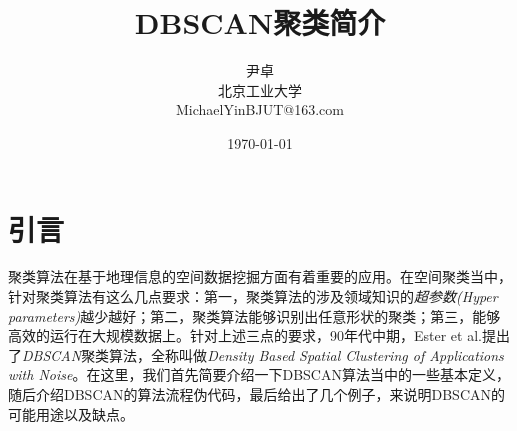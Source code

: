 \documentclass[UTF8, 12pt]{ctexart}
\begin{document}
\title{\heiti DBSCAN聚类简介}
\author{\kaishu 尹卓\\北京工业大学\\MichaelYinBJUT@163.com}
\date{\today}
\maketitle

\tableofcontents
\newpage

\section{引言}
聚类算法在基于地理信息的空间数据挖掘方面有着重要的应用。在空间聚类当中，针对聚类算法有这么几点要求：第一，聚类算法的涉及领域知识的\emph{超参数(Hyper parameters)}越少越好；第二，聚类算法能够识别出任意形状的聚类；第三，能够高效的运行在大规模数据上。针对上述三点的要求，90年代中期，Ester et al.\cite{ester1996density}提出了\emph{DBSCAN}聚类算法，全称叫做\emph{Density Based Spatial Clustering of Applications with Noise}。在这里，我们首先简要介绍一下DBSCAN算法当中的一些基本定义，随后介绍DBSCAN的算法流程伪代码，最后给出了几个例子，来说明DBSCAN的可能用途以及缺点。
\end{document}
